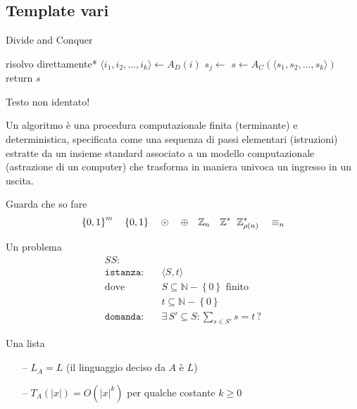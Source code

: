 \subsection{Template vari}

\begin{algorithm}[H]
\caption{Divide and Conquer}\label{alg:dnc}
\begin{algorithmic}[1]
            \State *risolvo direttamente*
        \EndIf
        \State $\langle i_1, i_2, \dots, i_k \rangle \gets A_D(i)$ 
            \State $s_j \gets $ 
        \EndFor
        \State $s \gets A_C(\langle s_1, s_2, \dots, s_k \rangle)$
        \State return $s$
    \EndProcedure
\end{algorithmic}
\end{algorithm}
\noindent
Testo non identato!

\begin{definition}[Algoritmo]\label{def:algex}
    Un algoritmo è una procedura computazionale finita (terminante) e deterministica, specificata come una sequenza di passi elementari (istruzioni) estratte da un insieme standard associato a un modello computazionale (astrazione di un computer) che trasforma in maniera univoca un ingresso in un uscita.
\end{definition}

Guarda che so fare
\begin{equation*}
    \left\{0,1\right\}^{m}
    \quad
    \left\{0,1\right\}^{}
    \quad
    \odot
    \quad
    \oplus
    \quad
    \mathbb{Z}_{n}
    \quad
    \mathbb{Z}_{\quad}^{*}
    \mathbb{Z}_{\rho(n)}^{*}
    \quad
    \equiv_n
\end{equation*}

Un problema
\begin{align*}
    SS: & \\
    \texttt{istanza:} \quad &
    \langle
        S,t
    \rangle
    \\
    \text{dove} \quad &
    S \subseteq \mathbb{N} - \left\{ 0 \right\} \text{ finito}
    \\
    &
    t \subseteq \mathbb{N} - \left\{ 0 \right\} \\
    \texttt{domanda:} \quad &
    \exists \, S' \subseteq S : \sum_{s \in S'}^{} s = t \, ?
\end{align*}

Una lista
\begin{itemize}[noitemsep,parsep=0pt,partopsep=0pt,topsep=0pt]
    \item[--] $L_A = L$ (il linguaggio deciso da $A$ è $L$)
    \item[--] $T_A(|x|) = O(|x|^k)$ per qualche costante $k \geq 0$
\end{itemize}

